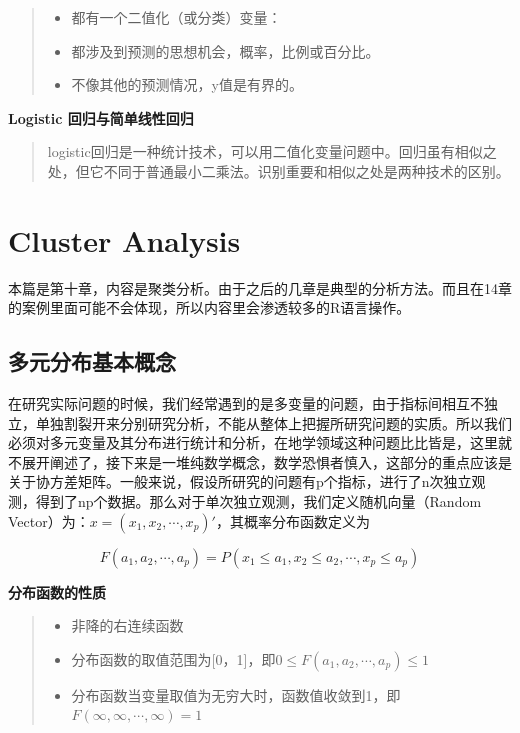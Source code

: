 \documentclass[]{ctexbook}
\providecommand{\tightlist}{%
  \setlength{\itemsep}{0pt}\setlength{\parskip}{0pt}}
\begin{document}
\begin{quote}
\begin{itemize}
\tightlist
\item
  都有一个二值化（或分类）变量：
\item
  都涉及到预测的思想机会，概率，比例或百分比。
\item
  不像其他的预测情况，y值是有界的。
\end{itemize}
\end{quote}

\textbf{Logistic 回归与简单线性回归}

\begin{quote}
logistic回归是一种统计技术，可以用二值化变量问题中。回归虽有相似之处，但它不同于普通最小二乘法。识别重要和相似之处是两种技术的区别。
\end{quote}

\hypertarget{cluster}{%
\chapter{Cluster Analysis}\label{cluster}}

本篇是第十章，内容是聚类分析。由于之后的几章是典型的分析方法。而且在14章的案例里面可能不会体现，所以内容里会渗透较多的R语言操作。

\hypertarget{ux591aux5143ux5206ux5e03ux57faux672cux6982ux5ff5}{%
\section{多元分布基本概念}\label{ux591aux5143ux5206ux5e03ux57faux672cux6982ux5ff5}}

在研究实际问题的时候，我们经常遇到的是多变量的问题，由于指标间相互不独立，单独割裂开来分别研究分析，不能从整体上把握所研究问题的实质。所以我们必须对多元变量及其分布进行统计和分析，在地学领域这种问题比比皆是，这里就不展开阐述了，接下来是一堆纯数学概念，数学恐惧者慎入，这部分的重点应该是关于协方差矩阵。一般来说，假设所研究的问题有p个指标，进行了n次独立观测，得到了np个数据。那么对于单次独立观测，我们定义随机向量（Random Vector）为：\(x=(x_1,x_2,\cdots,x_p)'\)，其概率分布函数定义为

\[F(a_1,a_2,\cdots,a_p)=P(x_1\le a_1,x_2\le a_2,\cdots,x_p\le a_p)\]

\textbf{分布函数的性质}

\begin{quote}
\begin{itemize}
\tightlist
\item
  非降的右连续函数
\item
  分布函数的取值范围为{[}0，1{]}，即\(0\le F(a_1,a_2,\cdots,a_p)\le 1\)
\item
  分布函数当变量取值为无穷大时，函数值收敛到1，即\(F(\infty,\infty,\cdots,\infty)=1\)
\end{itemize}
\end{quote}
\end{document}
